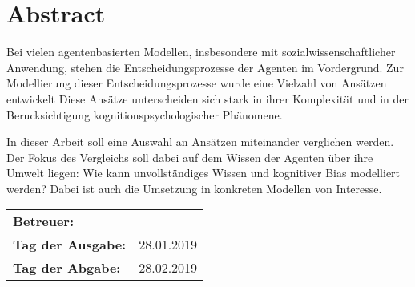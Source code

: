 \chapter*{Abstract}
Bei vielen agentenbasierten Modellen, insbesondere mit sozialwissenschaftlicher Anwendung, stehen die Entscheidungsprozesse der Agenten im Vordergrund. Zur
Modellierung dieser Entscheidungsprozesse wurde eine Vielzahl von Ansätzen entwickelt\cite{balke2014agents}
Diese Ansätze unterscheiden sich stark in ihrer Komplexität und in der Berucksichtigung
kognitionspsychologischer Phänomene.

In dieser Arbeit soll eine Auswahl an Ansätzen miteinander verglichen werden.
Der Fokus des Vergleichs soll dabei auf dem Wissen der Agenten über ihre Umwelt liegen: Wie kann unvollständiges Wissen und kognitiver Bias modelliert werden?
Dabei ist auch die Umsetzung in konkreten Modellen von Interesse.

\vfill

\begin{tabular}{ll}
	\bfseries Betreuer: & \parbox[t]{10cm}{\betreuer }\vspace{5mm} \\
	\bfseries Tag der Ausgabe: & 28.01.2019 \\
	\bfseries Tag der Abgabe: & 28.02.2019 \\
\end{tabular}
